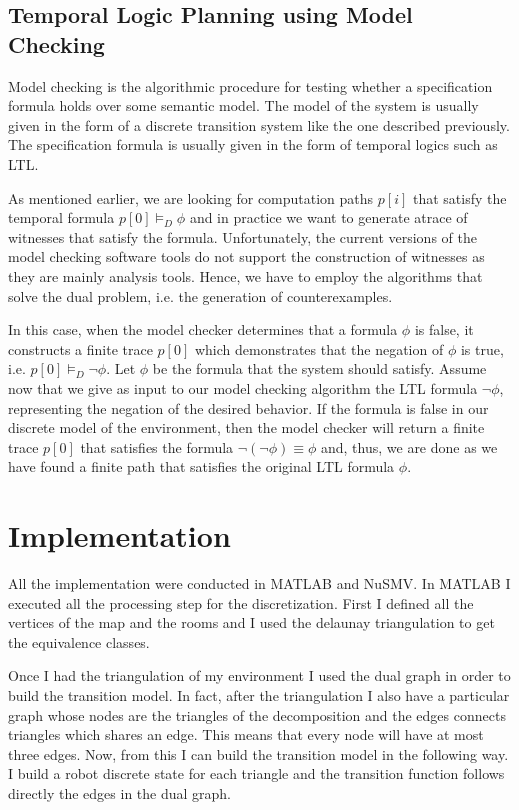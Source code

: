 \documentclass[conference,12pt]{IEEEtran}
\begin{document}
\subsection{Temporal Logic Planning using Model Checking}

Model checking is the algorithmic procedure for testing whether a specification formula holds over some semantic model. The model of the system is usually given in the form of a discrete transition system like the one described previously. The specification formula is usually given in the form of temporal logics such as LTL. 

As mentioned earlier, we are looking for computation
paths $p[i]$ that satisfy the temporal formula $p[0] \models_D \phi$ and in practice we want to generate atrace of witnesses that satisfy the formula. Unfortunately, the current versions of the model checking software tools do not support the construction of witnesses as they are mainly analysis tools. Hence, we have to employ the algorithms that solve the dual problem, i.e. the generation of counterexamples.

In this case, when the model checker determines that a formula $\phi$ is false, it constructs a finite trace $p[0]$ which demonstrates that the negation of $\phi$ is true, i.e. $p[0] \models_D \neg \phi$. Let $\phi$ be the formula that the system should satisfy. Assume now that we give as input to our model checking algorithm the LTL formula $\neg \phi$, representing the negation of the desired behavior. If the formula is false in our discrete model of the environment, then the model checker will return a finite trace $p[0]$ that satisfies the formula $\neg(\neg \phi)\equiv \phi$ and, thus, we are done as we have found a finite path that satisfies the original LTL formula $\phi$.

\section{Implementation}

All the implementation were conducted in MATLAB and NuSMV. In MATLAB I executed all the processing step for the discretization. First I defined all the vertices of the map and the rooms and I used the  delaunay triangulation to get the equivalence classes.

Once I had the triangulation of my environment I used the dual graph in order to build the transition model. In fact, after the triangulation I also have a particular graph whose nodes are the triangles of the decomposition and the edges connects triangles which shares an edge. This means that every node will have at most three edges. Now, from this I can build the transition model in the following way. I build a robot discrete state for each triangle and the transition function follows directly the edges in the dual graph.
\end{document}
